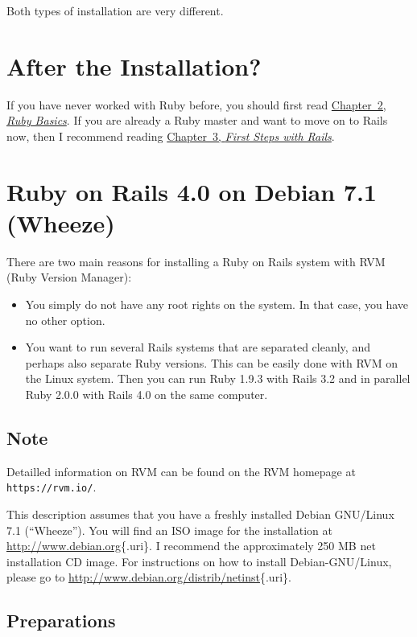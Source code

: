 \documentclass[a4paper]{book}
\begin{document}
Both types of installation are very different.

\section{After the Installation?}\label{after-the-installation}

If you have never worked with Ruby before, you should first read \hyperref[ruby-grundlagen]{Chapter~2, \emph{Ruby Basics}}. If you are already a Ruby master and want to move on to Rails now, then I recommend reading \hyperref[ersteux5fschritteux5fmitux5frails]{Chapter~3, \emph{First Steps with Rails}}.

\section{Ruby on Rails 4.0 on Debian 7.1 (Wheeze)}\label{ruby-on-rails-4.0-on-debian-7.1-wheeze}

There are two main reasons for installing a Ruby on Rails system with RVM (Ruby Version Manager):

\begin{itemize}
\itemsep1pt\parskip0pt
\item
  You simply do not have any root rights on the system. In that case, you have no other option.
\item
  You want to run several Rails systems that are separated cleanly, and perhaps also separate Ruby versions. This can be easily done with RVM on the Linux system. Then you can run Ruby 1.9.3 with Rails 3.2 and in parallel Ruby 2.0.0 with Rails 4.0 on the same computer.
\end{itemize}

\subsection{Note}\label{note}

Detailled information on RVM can be found on the RVM homepage at \texttt{https://rvm.io/}.

This description assumes that you have a freshly installed Debian GNU/Linux 7.1 (“Wheeze”). You will find an ISO image for the installation at \url{http://www.debian.org}\{.uri\}. I recommend the approximately 250 MB net installation CD image. For instructions on how to install Debian-GNU/Linux, please go to \url{http://www.debian.org/distrib/netinst}\{.uri\}.

\subsection{Preparations}\label{preparations}
\end{document}
